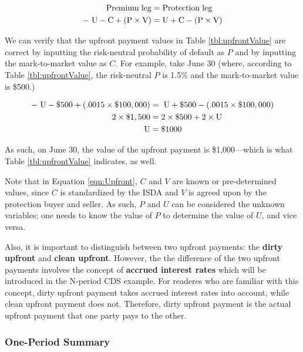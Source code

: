 \documentclass{jss}
\begin{document}
\begin{align}
  \rm Premium\hspace{3pt}leg &= \rm Protection\hspace{3pt}leg \\
  \rm -\hspace{3pt}U - C + (P \times V) &= \rm U + C - (P \times V)
  \label{eqn:Upfront}
\end{align}

We can verify that the upfront payment values in Table \ref{tbl:upfrontValue} are correct by inputting the risk-neutral probability of default as $P$ and by inputting the mark-to-market value as $C$. For example, take June 30 (where, according to Table \ref{tbl:upfrontValue}, the risk-neutral $P$ is 1.5\% and the mark-to-market value is \$500.)

\begin{align}
  \rm -\hspace{3pt}U - \$500 + (.0015 \times \$100,000) &= \rm \hspace{3pt}U + \$500 - (.0015 \times \$100,000) \\
  \rm 2 \times \$1,500 &= \rm 2 \times \$500 + 2 \times U \\
  \rm U &= \rm\$1000
\end{align}

As such, on June 30, the value of the upfront payment is \$1,000---which is what Table \ref{tbl:upfrontValue} indicates, as well.

Note that in Equation \eqref{eqn:Upfront}, $C$ and $V$ are known or pre-determined values, since $C$ is standardized by the ISDA and $V$ is agreed upon by the protection buyer and seller. As such, $P$ and $U$ can be considered the unknown variables; one needs to know the value of $P$ to determine the value of $U$, and vice versa.

Also, it is important to distinguish between two upfront payments: the \textbf{dirty upfront} and \textbf{clean upfront}. However, the the difference of the two upfront payments involves the concept of \textbf{accrued interest rates} which will be introduced in the N-period CDS example. For readeres who are familiar with this concept, dirty upfront payment takes accrued interest rates into account, while clean upfront payment does not. Therefore, dirty upfront payment is the actual upfront payment that one party pays to the other.

\subsubsection{One-Period Summary}
\end{document}
